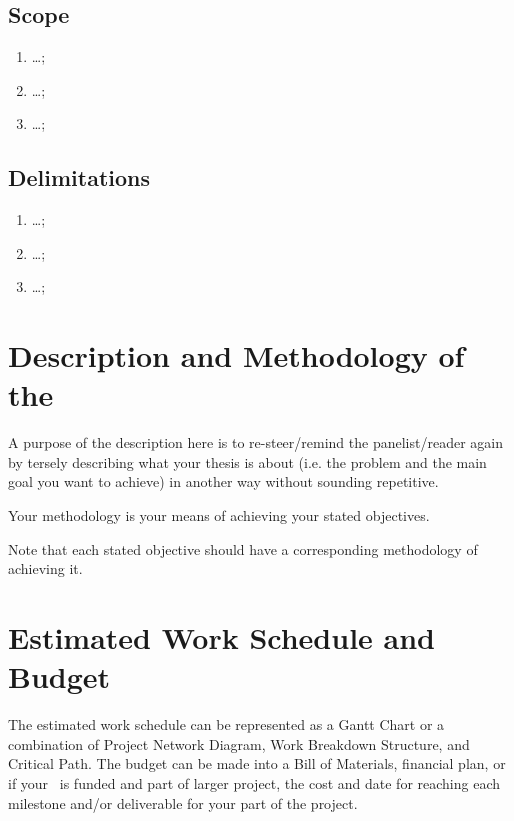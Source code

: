 \subsection{Scope}
\begin{enumerate}
	\item \ldots;

	\item \ldots;

	\item \ldots;
\end{enumerate}

\subsection{Delimitations}
\begin{enumerate}
	\item \ldots;

	\item \ldots;

	\item \ldots;
\end{enumerate}

\section{Description and Methodology of the \documentType}

A purpose of the description here is to re-steer/remind the panelist/reader again by tersely describing what your thesis is about (i.e. the problem and the main goal you want to achieve) in another way without sounding repetitive.

Your methodology is your means of achieving your stated objectives.

Note that each stated objective should have a corresponding methodology of achieving it.

\graytx{\blindtext}


\ifFinished
\else

\section{Estimated Work Schedule and Budget}

The estimated work schedule can be represented as a Gantt Chart or a combination of Project Network Diagram, Work Breakdown Structure, and Critical Path.  The budget can be made into a Bill of Materials, financial plan, or if your \documentType \ is funded and part of larger project, the cost and date for reaching each milestone and/or deliverable for your part of the project.

